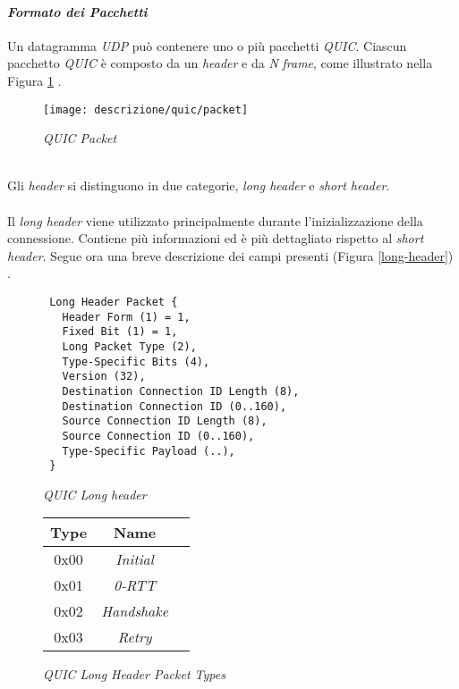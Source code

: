\paragraph{\textit{Formato dei Pacchetti}}
\noindent Un datagramma \emph{UDP} può contenere uno o più pacchetti \emph{QUIC}. Ciascun pacchetto \emph{QUIC} è composto da un \emph{header} e da \emph{N} \emph{frame}, come illustrato nella Figura \ref{quic-packet} \cite{site:Packet-Formats}.
\begin{figure}[!h]
    \centering
    \texttt{[image: descrizione/quic/packet]}
    \caption{\emph{QUIC Packet}}
    \label{quic-packet}
\end{figure}
\\
Gli \emph{header} si distinguono in due categorie, \emph{long header} e \emph{short header}. 
\\\\
Il \emph{long header} viene utilizzato principalmente durante l'inizializzazione della connessione. Contiene più informazioni ed è più dettagliato rispetto al \emph{short header}. Segue ora una breve descrizione dei campi presenti (Figura \ref{long-header}) \cite{site:Long-header}.
\begin{figure}[!h]
    \centering
    \begin{minipage}{0.48\textwidth}
        \centering
        \begin{small}
        \begin{BVerbatim}
 Long Header Packet {
   Header Form (1) = 1,
   Fixed Bit (1) = 1,
   Long Packet Type (2),
   Type-Specific Bits (4),
   Version (32),
   Destination Connection ID Length (8),
   Destination Connection ID (0..160),
   Source Connection ID Length (8),
   Source Connection ID (0..160),
   Type-Specific Payload (..),
 }
        \end{BVerbatim}
    \end{small}
        \caption{\emph{QUIC Long header}}
        \label{long-header}
    \end{minipage}
    \hfill
    \begin{minipage}{0.48\textwidth}
        \centering
        \begin{tabular}{|c|c|c|}
            \hline
            \textbf{Type} & \textbf{Name}  \\
            \hline
            0x00 & \emph{Initial} \\
            \hline
            0x01 & \emph{0-RTT}  \\
            \hline
            0x02 & \emph{Handshake}   \\
            \hline
            0x03 & \emph{Retry}  \\
            \hline
            \end{tabular}
        \caption{\emph{QUIC Long Header Packet Types}}
        \label{packet-type}
    \end{minipage}
\end{figure}

